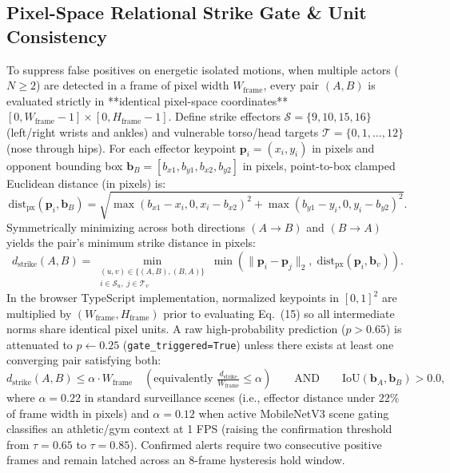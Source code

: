 \documentclass[conference]{IEEEtran}
\begin{document}
\subsection{Pixel-Space Relational Strike Gate & Unit Consistency}
To suppress false positives on energetic isolated motions, when multiple actors ($N \ge 2$) are detected in a frame of pixel width $W_{\text{frame}}$, every pair $(A, B)$ is evaluated strictly in **identical pixel-space coordinates** $[0, W_{\text{frame}}-1] \times [0, H_{\text{frame}}-1]$. Define strike effectors $\mathcal{S} = \{9, 10, 15, 16\}$ (left/right wrists and ankles) and vulnerable torso/head targets $\mathcal{T} = \{0, 1, \dots, 12\}$ (nose through hips). For each effector keypoint $\mathbf{p}_i = (x_i, y_i)$ in pixels and opponent bounding box $\mathbf{b}_B = [b_{x1}, b_{y1}, b_{x2}, b_{y2}]$ in pixels, point-to-box clamped Euclidean distance (in pixels) is:
\begin{equation}
\text{dist}_{\text{px}}(\mathbf{p}_i, \mathbf{b}_B) = \sqrt{\max(b_{x1}-x_i, 0, x_i-b_{x2})^2 + \max(b_{y1}-y_i, 0, y_i-b_{y2})^2}.
\end{equation}
Symmetrically minimizing across both directions $(A \rightarrow B)$ and $(B \rightarrow A)$ yields the pair's minimum strike distance in pixels:
\begin{equation}
d_{\text{strike}}(A, B) = \min_{\substack{(u, v) \in \{(A, B), (B, A)\} \\ i \in \mathcal{S}_u,\; j \in \mathcal{T}_v}} \min\!\left(\|\mathbf{p}_i - \mathbf{p}_j\|_2,\; \text{dist}_{\text{px}}(\mathbf{p}_i, \mathbf{b}_v)\right).
\end{equation}
In the browser TypeScript implementation, normalized keypoints in $[0, 1]^2$ are multiplied by $(W_{\text{frame}}, H_{\text{frame}})$ prior to evaluating Eq.~(15) so all intermediate norms share identical pixel units. A raw high-probability prediction ($p > 0.65$) is attenuated to $p \leftarrow 0.25$ (\texttt{gate\_triggered=True}) unless there exists at least one converging pair satisfying both:
\begin{equation}
d_{\text{strike}}(A, B) \le \alpha \cdot W_{\text{frame}} \quad (\text{equivalently } \tfrac{d_{\text{strike}}}{W_{\text{frame}}} \le \alpha) \qquad \text{AND} \qquad \text{IoU}(\mathbf{b}_A, \mathbf{b}_B) > 0.0,
\end{equation}
where $\alpha = 0.22$ in standard surveillance scenes (i.e., effector distance under $22\%$ of frame width in pixels) and $\alpha = 0.12$ when active MobileNetV3 scene gating classifies an athletic/gym context at 1 FPS (raising the confirmation threshold from $\tau = 0.65$ to $\tau = 0.85$). Confirmed alerts require two consecutive positive frames and remain latched across an 8-frame hysteresis hold window.
\end{document}

